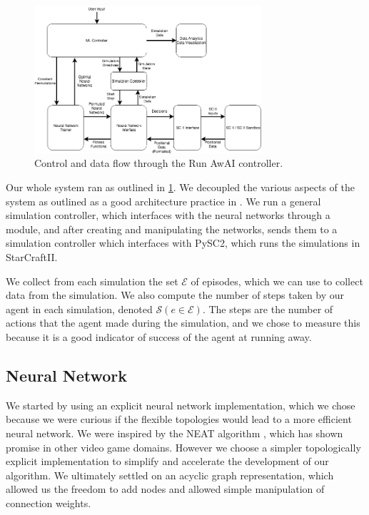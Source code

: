 \documentclass{article}
\begin{document}
\begin{figure}[h]\label{fig:flow chart}
\centering
\includegraphics[width=0.75\textwidth]{chart}
\begin{changemargin}{0.15in}{0.15in}
  \caption{Control and data flow through the Run AwAI controller.}
\end{changemargin}
\end{figure}

Our whole system ran as outlined in \ref{fig:flow chart}. We decoupled the
various aspects of the system as outlined as a good architecture practice in
\cite{pragprog}. We run a general simulation controller, which interfaces with
the neural networks through a module, and after creating and manipulating the
networks, sends them to a simulation controller which interfaces with PySC2,
which runs the simulations in StarCraftII.

We collect from each simulation the set $\bm{\mathcal{E}}$ of episodes, which we
can use to collect data from the simulation. We also compute the number of steps
taken by our agent in each simulation, denoted
$\mathcal{S}(e\in\bm{\mathcal{E}})$. The steps are the number of actions that
the agent made during the simulation, and we chose to measure this because it is
a good indicator of success of the agent at running away.

\subsection{Neural Network}
We started by using an explicit neural network implementation, which we chose
because we were curious if the flexible topologies would lead to a more
efficient neural network. We were inspired by the NEAT algorithm \cite{NEAT},
which has shown promise in other video game domains. However we choose a simpler
topologically explicit implementation to simplify and accelerate the development
of our algorithm. We ultimately settled on an acyclic graph representation,
which allowed us the freedom to add nodes and allowed simple manipulation of
connection weights.
\end{document}

